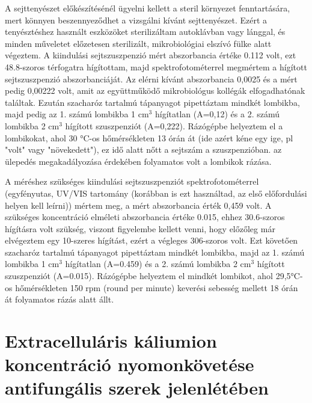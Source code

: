 A sejttenyészet előkészítésénél ügyelni kellett a steril környezet fenntartására, mert könnyen beszennyeződhet a vizsgálni kívánt sejttenyészet. Ezért a tenyésztéshez használt eszközöket sterilizáltam autoklávban vagy lánggal, és minden műveletet előzetesen sterilizált, mikrobiológiai elszívó fülke alatt végeztem. A kiindulási sejtszuszpenzió mért abszorbancia értéke 0.112 volt, ezt 48.8-szoros térfogatra hígítottam, majd spektrofotométerrel megmértem a hígított sejtszuszpenzió abszorbanciáját. Az elérni kívánt abszorbancia 0,0025 és a mért pedig 0,00222 volt, amit az együttműködő mikrobiológus kollégák elfogadhatónak találtak. Ezután szacharóz tartalmú tápanyagot pipettáztam mindkét lombikba, majd pedig az 1. számú lombikba 1 cm$^3$ hígítatlan (A=0,12) és a 2. számú lombikba 2 cm$^3$ hígított szuszpenziót (A=0,222). Rázógépbe helyeztem el a lombikokat, ahol 30 °C-os hőmérsékleten 13 órán át (ide azért kéne egy ige, pl "volt" vagy "növekedett"), ez idő alatt nőtt a sejtszám a szuszpenzióban. az ülepedés megakadályozása érdekében folyamatos volt a lombikok rázása. 

A méréshez szükséges kiindulási sejtszuszpenziót spektrofotométerrel (egyfényutas, UV/VIS tartomány (korábban is ezt használtad, az első előfordulási helyen kell leírni)) mértem meg, a mért abszorbancia érték 0,459 volt. A szükséges koncentráció elméleti abszorbancia értéke 0.015, ehhez 30.6-szoros hígításra volt szükség, viszont figyelembe kellett venni, hogy előzőleg már elvégeztem egy 10-szeres hígítást, ezért a végleges 306-szoros volt. Ezt követően szacharóz tartalmú tápanyagot pipettáztam mindkét lombikba, majd az 1. számú lombikba 1 cm$^3$ hígítatlan (A=0.459) és a 2. számú lombikba 2 cm$^3$ hígított szuszpenziót (A=0.015).  Rázógépbe helyeztem el mindkét lombikot, ahol 29,5°C-os hőmérsékleten 150 rpm (round per minute) keverési sebesség mellett 18 órán át folyamatos rázás alatt állt.

\section{Extracelluláris káliumion koncentráció nyomonkövetése antifungális szerek jelenlétében}

